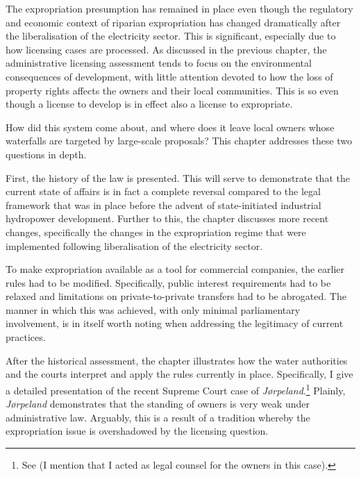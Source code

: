 
The expropriation presumption has remained in place even though the regulatory and economic context of riparian expropriation has changed dramatically after the liberalisation of the electricity sector.
This is significant, especially due to how licensing cases are processed. As discussed in the previous chapter, the administrative licensing assessment tends to focus on the environmental consequences of development, with little attention devoted to how the loss of property rights affects the owners and their local communities. This is so even though a license to develop is in effect also a license to expropriate. 

How did this system come about, and where does it leave local owners whose waterfalls are targeted by large-scale proposals? This chapter addresses these two questions in depth. 

First, the history of the law is presented. This will serve to demonstrate that the current state of affairs is in fact a complete reversal compared to the legal framework that was in place before the advent of state-initiated industrial hydropower development. Further to this, the chapter discusses more recent changes, specifically the changes in the expropriation regime that were implemented following liberalisation of the electricity sector. 

To make expropriation available as a tool for commercial companies, the earlier rules had to be modified. Specifically, public interest requirements had to be relaxed and limitations on private-to-private transfers had to be abrogated. The manner in which this was achieved, with only minimal parliamentary involvement, is in itself worth noting when addressing the legitimacy of current practices.

After the historical assessment, the chapter illustrates how the water authorities and the courts interpret and apply the rules currently in place. Specifically, I give a detailed presentation of the recent Supreme Court case of {\it Jørpeland}.\footnote{See \cite{jorpeland11} (I mention that I acted as legal counsel for the owners in this case).} Plainly, {\it Jørpeland} demonstrates that the standing of owners is very weak under administrative law. Arguably, this is a result of a tradition whereby the expropriation issue is overshadowed by the licensing question.

